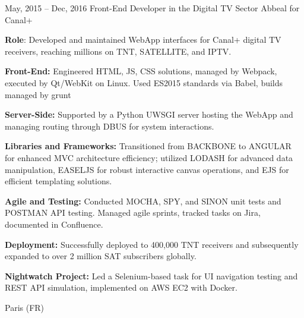 \documentclass[
  a4paper,
   maincolor=cvblue,
   sectioncolor=cvblue,
   sidebarwidth=0.323\paperwidth,
]{fortysecondscv}
\begin{document}
\begin{cvtableNew}
  \cvitemRightNew
    {May, 2015 – Dec, 2016} %
    {Front-End Developer in the Digital TV Sector} %
    {Abbeal for Canal+} %
    {
      \vspace{-0.4pt} %
      \textbf{Role}: Developed and maintained WebApp interfaces for Canal+ digital TV receivers, reaching millions on TNT, SATELLITE, and IPTV.\par
      \vspace{4pt}
      \textbf{Front-End:} Engineered HTML, JS, CSS solutions, managed by Webpack, executed by Qt/WebKit on Linux. Used ES2015 standards via Babel, builds managed by grunt\par
      \vspace{4pt}
      \textbf{Server-Side:} Supported by a Python UWSGI server hosting the WebApp and managing routing through DBUS for system interactions.\par
      \vspace{4pt}
      \textbf{Libraries and Frameworks:} Transitioned from BACKBONE to ANGULAR for enhanced MVC architecture efficiency; utilized LODASH for advanced data manipulation, EASELJS for robust interactive canvas operations, and EJS for efficient templating solutions.\par
      \vspace{4pt}
      \textbf{Agile and Testing:} Conducted MOCHA, SPY, and SINON unit tests and POSTMAN API testing. Managed agile sprints, tracked tasks on Jira, documented in Confluence.\par
      \vspace{4pt}
      \textbf{Deployment:} Successfully deployed to 400,000 TNT receivers and subsequently expanded to over 2 million SAT subscribers globally.\par
      \vspace{4pt}
      \textbf{Nightwatch Project:} Led a Selenium-based task for UI navigation testing and REST API simulation, implemented on AWS EC2 with Docker.\par
      \vspace{4pt} %
    }
    {Paris (FR)} %
\end{cvtableNew}
\end{document}
